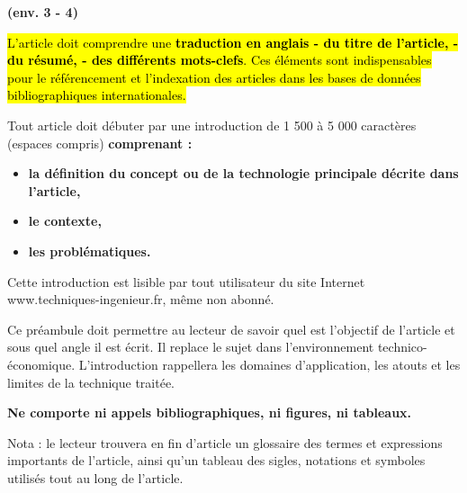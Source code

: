 \documentclass[a4paper,12pt]{article}
\begin{document}
\begin{EnglishKeyWords}
	\textbf{(env. 3 - 4)}
\end{EnglishKeyWords}


\vspace{1cm}
\begin{Remark}%
	\hl{L'article doit comprendre une \textbf{traduction en anglais - du titre de l'article, - du r\'esum\'e, - des diff\'erents mots-clefs}. Ces \'el\'ements sont indispensables pour le r\'ef\'erencement et l'indexation des articles dans les bases de donn\'ees bibliographiques internationales.}
\end{Remark}


\clearpage
\tableofcontents

\begin{Introduction}
	Tout article doit d\'ebuter par une introduction de 1 500 \`a 5 000 caract\`eres (espaces compris) \textbf{comprenant :}
	\begin{itemize}
	\item \textbf{la d\'efinition du concept ou de la technologie principale d\'ecrite dans l'article, }
	\item \textbf{le contexte, }
	\item \textbf{les probl\'ematiques. }
	\end{itemize}

	Cette introduction est lisible par tout utilisateur du site Internet www.techniques-ingenieur.fr, m\^eme non abonn\'e.\newline
	
	Ce pr\'eambule doit permettre au lecteur de savoir quel est l'objectif de l'article et sous quel angle il est \'ecrit. Il replace le sujet dans l'environnement technico-\'economique. L'introduction rappellera les domaines d'application, les atouts et les limites de la technique trait\'ee.\newline
	
	\textbf{Ne comporte ni appels bibliographiques, ni figures, ni tableaux.}\newline
	
	Nota : le lecteur trouvera en fin d'article un glossaire des termes et expressions importants de l'article, ainsi qu'un tableau des sigles, notations et symboles utilis\'es tout au long de l'article.
\end{Introduction}
\end{document}
